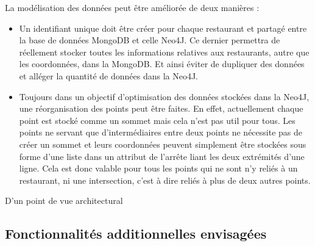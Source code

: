 \documentclass[11pt,a4paper]{article}
\begin{document}
    La modélisation des données peut être améliorée de deux manières :
    
    \begin{itemize}
        \item Un identifiant unique doit être créer pour chaque restaurant et partagé entre la base de données MongoDB et celle Neo4J. Ce dernier permettra de réellement stocker toutes les informations relatives aux restaurants, autre que les coordonnées, dans la MongoDB. Et ainsi éviter de dupliquer des données et alléger la quantité de données dans la Neo4J.
        \item Toujours dans un objectif d'optimisation des données stockées dans la Neo4J, une réorganisation des points peut être faites. En effet, actuellement chaque point est stocké comme un sommet mais cela n'est pas util pour tous. Les points ne servant que d'intermédiaires entre deux points ne nécessite pas de créer un sommet et leurs coordonnées peuvent simplement être stockées sous forme d'une liste dans un attribut de l'arrête liant les deux extrémités d'une ligne. Cela est donc valable pour tous les points qui ne sont n'y reliés à un restaurant, ni une intersection, c'est à dire reliés à plus de deux autres points.
    \end{itemize}

    D'un point de vue architectural

\subsection{Fonctionnalités additionnelles envisagées}
\end{document}

